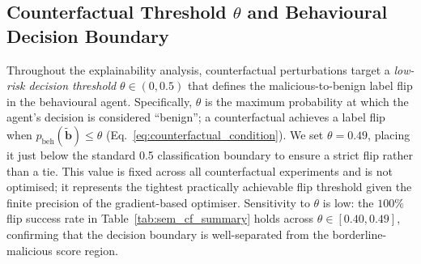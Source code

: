 \documentclass[3p]{elsarticle}
\begin{document}
\begin{table}[t]
\centering
{}
\caption{Fusion and triage performance under safety-optimal and low-escalation policies.}
\label{tab:fusion_policies}
\end{table}

\subsection{Counterfactual Threshold $\theta$ and Behavioural Decision Boundary}
\label{subsec:theta}

Throughout the explainability analysis, counterfactual perturbations target a
\emph{low-risk decision threshold} $\theta \in (0, 0.5)$ that defines the malicious-to-benign
label flip in the behavioural agent. Specifically, $\theta$ is the maximum probability at
which the agent's decision is considered ``benign''; a counterfactual achieves a label flip
when $p_{\mathrm{beh}}(\tilde{\mathbf{b}}) \le \theta$ (Eq.~\ref{eq:counterfactual_condition}).
We set $\theta = 0.49$, placing it just below the standard 0.5 classification boundary to
ensure a strict flip rather than a tie. This value is fixed across all counterfactual
experiments and is not optimised; it represents the tightest practically achievable flip
threshold given the finite precision of the gradient-based optimiser. Sensitivity to $\theta$
is low: the $100\%$ flip success rate in Table~\ref{tab:sem_cf_summary} holds across
$\theta \in [0.40, 0.49]$, confirming that the decision boundary is well-separated from the
borderline-malicious score region.
\end{document}
